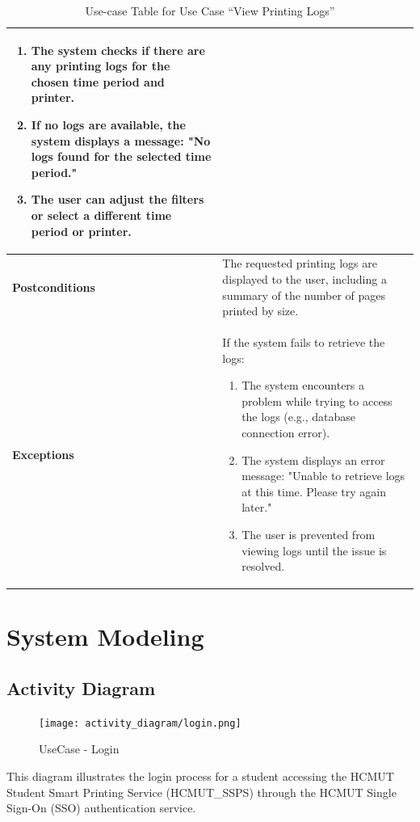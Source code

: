 \documentclass[a4paper]{report}
\begin{document}
\begin{enumerate}
\begin{table}[h!]
\begin{tabular}{|>{\centering\arraybackslash}m{3cm}|>{\raggedright\arraybackslash}m{10cm}|}
            \begin{enumerate}
                \item The system checks if there are any printing logs for the chosen time period and printer.
                \item If no logs are available, the system displays a message: "No logs found for the selected time period."
                \item The user can adjust the filters or select a different time period or printer.
            \end{enumerate} \\ \hline
            \textbf{Postconditions} & The requested printing logs are displayed to the user, including a summary of the number of pages printed by size. \\ \hline
            \textbf{Exceptions} & If the system fails to retrieve the logs:
            \begin{enumerate}
                \item The system encounters a problem while trying to access the logs (e.g., database connection error).
                \item The system displays an error message: "Unable to retrieve logs at this time. Please try again later."
                \item The user is prevented from viewing logs until the issue is resolved.
            \end{enumerate} \\ \hline
            \end{tabular}
            \caption{Use-case Table for Use Case “View Printing Logs”}
            \label{tab:view_printing_logs_use_case}
        \end{table}
\end{enumerate}


\chapter{System Modeling}
\section{Activity Diagram}

\begin{figure}[H]
    \centering
    \texttt{[image: activity\_diagram/login.png]}
    \caption{UseCase - Login}
\end{figure}

This diagram illustrates the login process for a student accessing the HCMUT Student Smart Printing Service (HCMUT\_SSPS) through the HCMUT Single Sign-On (SSO) authentication service.
\end{document}
